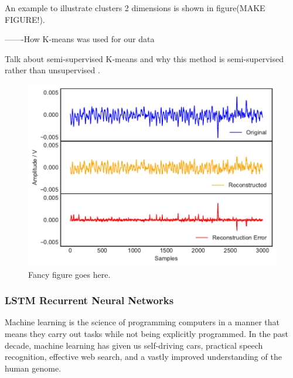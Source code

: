 An example to illustrate clusters 2 dimensions is shown in figure(MAKE FIGURE!). 

-------How K-means was used for our data


Talk about semi-supervised K-means and why this method is semi-supervised rather than unsupervised \cite{596afe3f2b5a4ff3b8f4f9793ad2f4ee}.

\begin{figure}[t]
    \includegraphics[width=1.0\textwidth]{fig/kmeans.pdf}
    \caption[K mean clustering plot]{Fancy figure goes here.}
    \label{fig:kmeanerror}
\end{figure}

\subsubsection{LSTM Recurrent Neural Networks}
\label{subsec:LSTM}

Machine learning is the science of programming computers in a manner that means they carry out tasks while not being explicitly programmed. In the past decade, machine learning has given us self-driving cars, practical speech recognition, effective web search, and a vastly improved understanding of the human genome.


